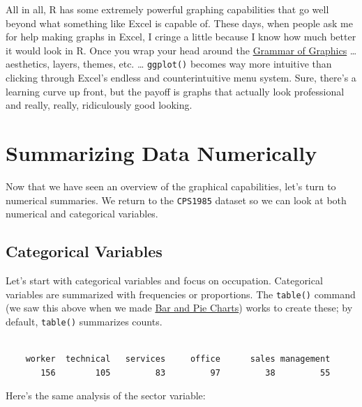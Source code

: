 \documentclass[
  letterpaper,
]{book}
\newenvironment{Shaded}{\begin{snugshade}}{\end{snugshade}}
\newcommand{\FunctionTok}[1]{\textcolor[rgb]{0.28,0.35,0.67}{#1}}
\newcommand{\NormalTok}[1]{\textcolor[rgb]{0.00,0.23,0.31}{#1}}
\newcommand{\SpecialCharTok}[1]{\textcolor[rgb]{0.37,0.37,0.37}{#1}}
\begin{document}
All in all, R has some extremely powerful graphing capabilities that go
well beyond what something like Excel is capable of. These days, when
people ask me for help making graphs in Excel, I cringe a little because
I know how much better it would look in R. Once you wrap your head
around the \hyperref[grammar-of-graphics]{Grammar of Graphics} \ldots{}
aesthetics, layers, themes, etc. \ldots{} \texttt{ggplot()} becomes way
more intuitive than clicking through Excel's endless and
counterintuitive menu system. Sure, there's a learning curve up front,
but the payoff is graphs that actually look professional and really,
really, ridiculously good looking.

\section{Summarizing Data
Numerically}\label{summarizing-data-numerically}

Now that we have seen an overview of the graphical capabilities, let's
turn to numerical summaries. We return to the \texttt{CPS1985} dataset
so we can look at both numerical and categorical variables.

\subsection{Categorical Variables}\label{categorical-variables}

Let's start with categorical variables and focus on occupation.
Categorical variables are summarized with frequencies or proportions.
The \texttt{table()} command (we saw this above when we made
\hyperref[bar-and-pie-charts]{Bar and Pie Charts}) works to create
these; by default, \texttt{table()} summarizes counts.

\begin{Shaded}
\end{Shaded}

\begin{verbatim}

    worker  technical   services     office      sales management 
       156        105         83         97         38         55 
\end{verbatim}

Here's the same analysis of the sector variable:
\end{document}
